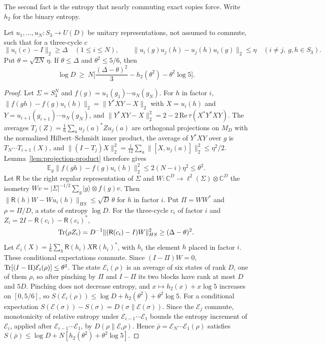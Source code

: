 The second fact is the entropy that nearly commuting exact copies force. Write $h_2$ for the binary entropy.

\begin{lemma}\label{lem:imp-sector}
Let $u_1,\dots,u_N:S_3\to U(D)$ be unitary representations, not assumed to commute, such that for a three-cycle $c$
\[
\|u_i(c)-I\|_2\ge\Delta\quad(1\le i\le N),\qquad\|u_i(g)u_j(h)-u_j(h)u_i(g)\|_2\le\eta\quad(i\ne j,\ g,h\in S_3).
\]
Put $\theta=\sqrt{2N}\,\eta$. If $\theta\le\Delta$ and $\theta^2\le5/6$, then
\[
\log D\ \ge\ N\Big[\frac{(\Delta-\theta)^2}3-h_2(\theta^2)-\theta^2\log5\Big].
\]
\end{lemma}

\begin{proof}
Let $\Sigma=S_3^N$ and $f(g)=u_1(g_1)\cdots u_N(g_N)$. For $h$ in factor $i$, $\|f(gh)-f(g)u_i(h)\|_2=\|Y^*XY-X\|_2$ with $X=u_i(h)$ and
$Y=u_{i+1}(g_{i+1})\cdots u_N(g_N)$, and $\|Y^*XY-X\|_2^2=2-2\,\mathrm{Re}\,\tau(X^*Y^*XY)$. The averages
$T_j(Z)=\frac16\sum_au_j(a)^*Zu_j(a)$ are orthogonal projections on $M_D$ with the normalized Hilbert--Schmidt inner product, the average of
$Y^*XY$ over $g$ is $T_N\cdots T_{i+1}(X)$, and $\|(I-T_j)X\|_2^2=\frac1{12}\sum_a\|[X,u_j(a)]\|_2^2\le\eta^2/2$.
Lemma~\ref{lem:projection-product} therefore gives
\[
\mathbb E_g\|f(gh)-f(g)u_i(h)\|_2^2\le2(N-i)\eta^2\le\theta^2 .
\]
Let $\mathsf R$ be the right regular representation of $\Sigma$ and $W:\mathbb C^D\to\ell^2(\Sigma)\otimes\mathbb C^D$ the isometry
$Wv=|\Sigma|^{-1/2}\sum_g|g\rangle\otimes f(g)v$. Then $\|\mathsf R(h)W-Wu_i(h)\|_{HS}\le\sqrt D\,\theta$ for $h$ in factor $i$. Put $\Pi=WW^*$ and
$\rho=\Pi/D$, a state of entropy $\log D$. For the three-cycle $c_i$ of factor $i$ and $Z_i=2I-\mathsf R(c_i)-\mathsf R(c_i)^*$,
\[
\operatorname{Tr}(\rho Z_i)=D^{-1}\|(\mathsf R(c_i)-I)W\|_{HS}^2\ge(\Delta-\theta)^2 .
\]
Let $\mathcal E_i(X)=\frac16\sum_h\mathsf R(h_i)X\mathsf R(h_i)^*$, with $h_i$ the element $h$ placed in factor $i$. These conditional expectations
commute. Since $(I-\Pi)W=0$, $\operatorname{Tr}[(I-\Pi)\mathcal E_i(\rho)]\le\theta^2$. The state $\mathcal E_i(\rho)$ is an average of six states of rank $D$, one
of them $\rho$, so after pinching by $\Pi$ and $I-\Pi$ its two blocks have rank at most $D$ and $5D$. Pinching does not decrease entropy, and
$x\mapsto h_2(x)+x\log5$ increases on $[0,5/6]$, so $S(\mathcal E_i(\rho))\le\log D+h_2(\theta^2)+\theta^2\log5$. For a conditional expectation
$S(\mathcal E(\sigma))-S(\sigma)=D(\sigma\|\mathcal E(\sigma))$. Since the $\mathcal E_j$ commute, monotonicity of relative entropy under
$\mathcal E_{i-1}\cdots\mathcal E_1$ bounds the entropy increment of $\mathcal E_i$, applied after $\mathcal E_{i-1}\cdots\mathcal E_1$, by
$D(\rho\|\mathcal E_i\rho)$. Hence $\bar\rho=\mathcal E_N\cdots\mathcal E_1(\rho)$ satisfies $S(\bar\rho)\le\log D+N[h_2(\theta^2)+\theta^2\log5]$.


\end{proof}
